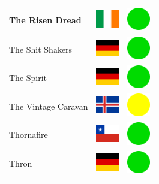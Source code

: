 \documentclass[12pt, a4paper, twoside]{report}
\begin{document}
\begin{center}
\begin{longtable}{|p{5cm}|p{2cm}|p{2cm}|}
The Risen Dread & \includegraphics[width=1cm]{4x3/ie} & \includegraphics[width=1cm]{likes/y} \\ \hline
The Shit Shakers & \includegraphics[width=1cm]{4x3/de} & \includegraphics[width=1cm]{likes/y} \\ \hline
The Spirit & \includegraphics[width=1cm]{4x3/de} & \includegraphics[width=1cm]{likes/y} \\ \hline
The Vintage Caravan & \includegraphics[width=1cm]{4x3/is} & \includegraphics[width=1cm]{likes/m} \\ \hline
Thornafire & \includegraphics[width=1cm]{4x3/cl} & \includegraphics[width=1cm]{likes/y} \\ \hline
Thron & \includegraphics[width=1cm]{4x3/de} & \includegraphics[width=1cm]{likes/y} \\ \hline

\end{longtable}
\end{center}
\end{document}
